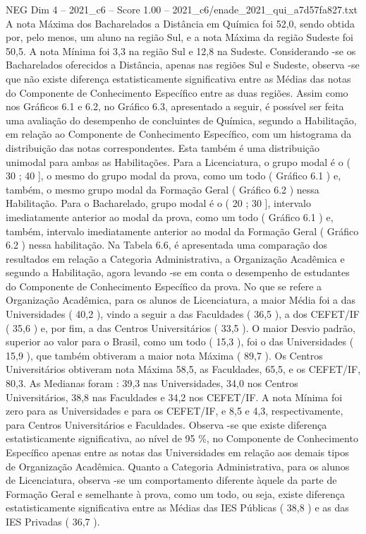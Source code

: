 \begin{textsample}{NEG Dim 4 – 2021\_c6 – Score 1.00 – 2021\_c6/enade\_2021\_qui\_a7d57fa827.txt}
A nota Máxima dos Bacharelados a Distância em Química foi 52,0, sendo obtida por, pelo menos, um aluno na região Sul, e a nota Máxima da região Sudeste foi 50,5.
A nota Mínima foi 3,3 na região Sul e 12,8 na Sudeste.
Considerando -se os Bacharelados oferecidos a Distância, apenas nas regiões Sul e Sudeste, observa -se que não existe diferença estatisticamente significativa entre as Médias das notas do Componente de Conhecimento Específico entre as duas regiões.
Assim como nos Gráficos 6.1 e 6.2, no Gráfico 6.3, apresentado a seguir, é possível ser feita uma avaliação do desempenho de concluintes de Química, segundo a Habilitação, em relação ao Componente de Conhecimento Específico, com um histograma da distribuição das notas correspondentes.
Esta também é uma distribuição unimodal para ambas as Habilitações.
Para a Licenciatura, o grupo modal é o ( 30 ; 40 ], o mesmo do grupo modal da prova, como um todo ( Gráfico 6.1 ) e, também, o mesmo grupo modal da Formação Geral ( Gráfico 6.2 ) nessa Habilitação.
Para o Bacharelado, grupo modal é o ( 20 ; 30 ], intervalo imediatamente anterior ao modal da prova, como um todo ( Gráfico 6.1 ) e, também, intervalo imediatamente anterior ao modal da Formação Geral ( Gráfico 6.2 ) nessa habilitação.
Na Tabela 6.6, é apresentada uma comparação dos resultados em relação a Categoria Administrativa, a Organização Acadêmica e segundo a Habilitação, agora levando -se em conta o desempenho de estudantes do Componente de Conhecimento Específico da prova.
No que se refere a Organização Acadêmica, para os alunos de Licenciatura, a maior Média foi a das Universidades ( 40,2 ), vindo a seguir a das Faculdades ( 36,5 ), a dos CEFET/IF ( 35,6 ) e, por fim, a das Centros Universitários ( 33,5 ).
O maior Desvio padrão, superior ao valor para o Brasil, como um todo ( 15,3 ), foi o das Universidades ( 15,9 ), que também obtiveram a maior nota Máxima ( 89,7 ).
Os Centros Universitários obtiveram nota Máxima 58,5, as Faculdades, 65,5, e os CEFET/IF, 80,3.
As Medianas foram : 39,3 nas Universidades, 34,0 nos Centros Universitários, 38,8 nas Faculdades e 34,2 nos CEFET/IF.
A nota Mínima foi zero para as Universidades e para os CEFET/IF, e 8,5 e 4,3, respectivamente, para Centros Universitários e Faculdades.
Observa -se que existe diferença estatisticamente significativa, ao nível de 95 \%, no Componente de Conhecimento Específico apenas entre as notas das Universidades em relação aos demais tipos de Organização Acadêmica.
Quanto a Categoria Administrativa, para os alunos de Licenciatura, observa -se um comportamento diferente àquele da parte de Formação Geral e semelhante à prova, como um todo, ou seja, existe diferença estatisticamente significativa entre as Médias das IES Públicas ( 38,8 ) e as das IES Privadas ( 36,7 ).

\end{textsample}
